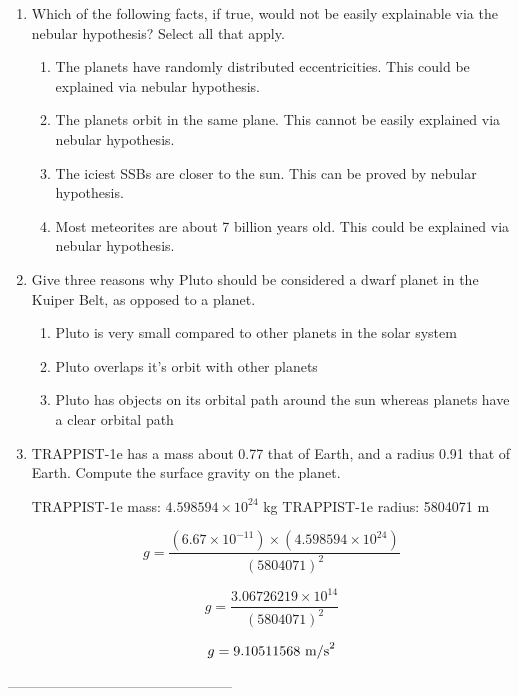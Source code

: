 \documentclass[12pt]{article}
\begin{document}
\begin{enumerate}
        \item Which of the following facts, if true, would not be easily explainable via the nebular hypothesis? Select all that apply.
        \begin{enumerate}
            \item The planets have randomly distributed eccentricities.\newline
                This could be explained via nebular hypothesis.
            \item The planets orbit in the same plane.\newline
                This cannot be easily explained via nebular hypothesis.
            \item The iciest SSBs are closer to the sun.\newline
                This can be proved by nebular hypothesis.
            \item Most meteorites are about 7 billion years old.\newline
                This could be explained via nebular hypothesis.
        \end{enumerate}
        \item Give three reasons why Pluto should be considered a dwarf planet in the Kuiper Belt, as opposed to a planet.
            \begin{enumerate}
                \item Pluto is very small compared to other planets in the solar system
                \item Pluto overlaps it's orbit with other planets
                \item Pluto has objects on its orbital path around the sun whereas planets have a clear orbital path
            \end{enumerate}
        \item TRAPPIST-1e has a mass about 0.77 that of Earth, and a radius 0.91 that of Earth. Compute the surface gravity on the planet.\newline

        TRAPPIST-1e mass: $4.598594\times10^{24}$ kg\newline
        TRAPPIST-1e radius: 5804071 m


        \begin{equation}
          g = \frac{(6.67 \times 10^{-11})\times(4.598594\times10^{24})}{(5804071)^{2}}
        \end{equation}

        \begin{equation}
          g = \frac{3.06726219\times10^{14}}{(5804071)^{2}}
        \end{equation}

        \begin{equation}
          g = 9.10511568 \textnormal{ m/s}^{2}
        \end{equation}

\end{enumerate}
————————————————
\end{document}
